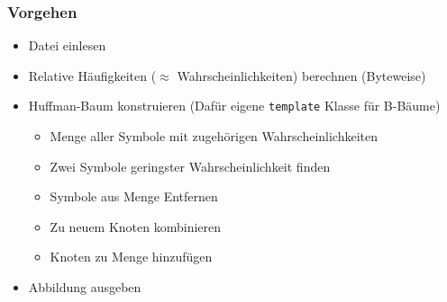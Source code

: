 \documentclass[aspectratio=169]{beamer}
\begin{document}
\begin{frame}
    \frametitle{Vorgehen}
    \begin{itemize}
        \item Datei einlesen
            \pause
        \item Relative Häufigkeiten ($\approx$ Wahrscheinlichkeiten) berechnen (Byteweise)
            \pause
        \item Huffman-Baum konstruieren (Dafür eigene \lstinline{template} Klasse für B-Bäume)
            \pause
            \begin{itemize}
                \item Menge aller Symbole mit zugehörigen Wahrscheinlichkeiten
                    \pause
                \item Zwei Symbole geringster Wahrscheinlichkeit finden
                    \pause
                \item Symbole aus Menge Entfernen
                    \pause
                \item Zu neuem Knoten kombinieren
                    \pause
                \item Knoten zu Menge hinzufügen
                    \pause
            \end{itemize}
        \item Abbildung ausgeben
    \end{itemize}
\end{frame}
\end{document}
